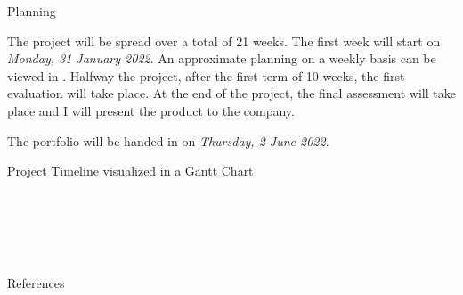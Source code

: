 \documentclass{matthijs}
\begin{document}
	\begin{hoofdstuk}{Planning}

		The project will be spread over a total of 21 weeks.
		The first week will start on \textit{Monday, 31 January 2022}.
		An approximate planning on a weekly basis can be viewed in .
		Halfway the project, after the first term of 10 weeks, the first evaluation will take place.
		At the end of the project, the final assessment will take place and I will present the product to the company.
		
		\bigskip

		The portfolio will be handed in on \textit{Thursday, 2 June 2022}.

		\begin{figuur}{Project Timeline visualized in a Gantt Chart}
			\begin{ganttchart}[vgrid,hgrid]{1}{21}
				 \\
				 \\

				 \\
				 \\
				 \ganttnewline
				 \ganttnewline
				 \ganttnewline
				 \ganttnewline
				 \ganttnewline
				 \ganttnewline
				 \ganttnewline
				 \ganttnewline
				
				 \ganttnewline
				 \ganttnewline
				 \ganttnewline
				 \ganttnewline
				 \ganttnewline
				

			\end{ganttchart}
		\end{figuur}
		
	\end{hoofdstuk}

	\begin{hoofdstuk}{References}
		\printbibliography[heading=none]
	\end{hoofdstuk}

	\clearpage
	\thispagestyle{empty}
	\addtocounter{page}{-1}
	\
	\clearpage
\end{document}
